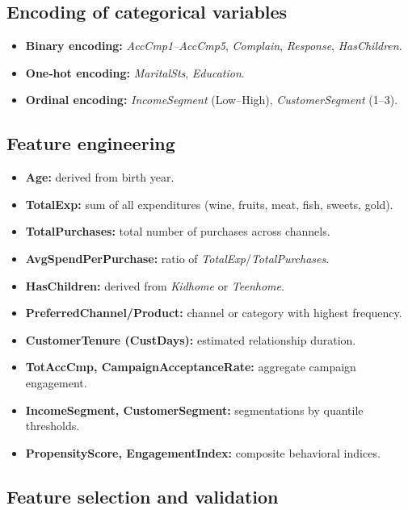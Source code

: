 \subsection{Encoding of categorical variables}

\begin{itemize}[leftmargin=1.2cm]
    \item \textbf{Binary encoding:} \textit{AccCmp1–AccCmp5}, \textit{Complain},
    \textit{Response}, \textit{HasChildren}.
    \item \textbf{One‐hot encoding:} \textit{MaritalSts}, \textit{Education}.
    \item \textbf{Ordinal encoding:} \textit{IncomeSegment} (Low–High),
    \textit{CustomerSegment} (1–3).
\end{itemize}

\subsection{Feature engineering}

\begin{itemize}[leftmargin=1.2cm]
    \item \textbf{Age:} derived from birth year.
    \item \textbf{TotalExp:} sum of all expenditures (wine, fruits, meat, fish, sweets, gold).
    \item \textbf{TotalPurchases:} total number of purchases across channels.
    \item \textbf{AvgSpendPerPurchase:} ratio of \textit{TotalExp}/\textit{TotalPurchases}.
    \item \textbf{HasChildren:} derived from \textit{Kidhome} or \textit{Teenhome}.
    \item \textbf{PreferredChannel/Product:} channel or category with highest frequency.
    \item \textbf{CustomerTenure (CustDays):} estimated relationship duration.
    \item \textbf{TotAccCmp, CampaignAcceptanceRate:} aggregate campaign engagement.
    \item \textbf{IncomeSegment, CustomerSegment:} segmentations by quantile thresholds.
    \item \textbf{PropensityScore, EngagementIndex:} composite behavioral indices.
\end{itemize}

\subsection{Feature selection and validation}

